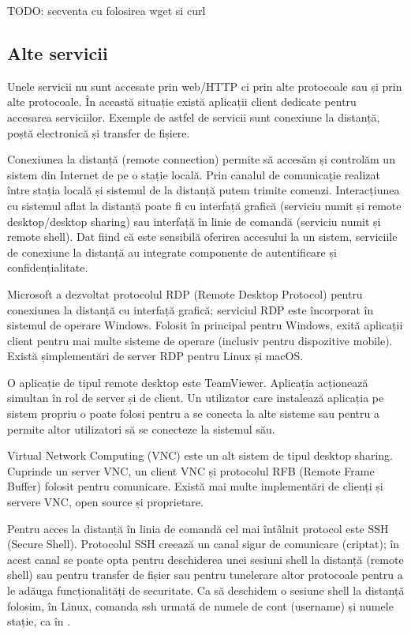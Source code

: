 \begin{screen}[caption={Clienți web în linie de comandă: wget și curl}{lst:sec:wget-curl}]
TODO: secventa cu folosirea wget si curl
\end{screen}

\subsection{Alte servicii}
\label{sec:net:services}

Unele servicii nu sunt accesate prin web/HTTP ci prin alte protocoale sau și prin alte protocoale. În această situație există aplicații client dedicate pentru accesarea serviciilor. Exemple de astfel de servicii sunt conexiune la distanță, poștă electronică și transfer de fișiere.

Conexiunea la distanță (remote connection) permite să accesăm și controlăm un sistem din Internet de pe o stație locală. Prin canalul de comunicație realizat între stația locală și sistemul de la distanță putem trimite comenzi. Interacțiunea cu sistemul aflat la distanță poate fi cu interfață grafică (serviciu numit și remote desktop/desktop sharing) sau interfață în linie de comandă (serviciu numit și remote shell). Dat fiind că este sensibilă oferirea accesului la un sistem, serviciile de conexiune la distanță au integrate componente de autentificare și confidențialitate.

Microsoft a dezvoltat protocolul RDP (Remote Desktop Protocol) pentru conexiunea la distanță cu interfață grafică; serviciul RDP este încorporat în sistemul de operare Windows. Folosit în principal pentru Windows, exită aplicații client pentru mai multe sisteme de operare (inclusiv pentru dispozitive mobile). Există șimplementări de server RDP pentru Linux și macOS.

O aplicație de tipul remote desktop este TeamViewer. Aplicația acționează simultan în rol de server și de client. Un utilizator care instalează aplicația pe sistem propriu o poate folosi pentru a se conecta la alte sisteme sau pentru a permite altor utilizatori să se conecteze la sistemul său.

Virtual Network Computing (VNC) este un alt sistem de tipul desktop sharing. Cuprinde un server VNC, un client VNC și protocolul RFB (Remote Frame Buffer) folosit pentru comunicare. Există mai multe implementări de clienți și servere VNC, open source și proprietare.

Pentru acces la distanță în linia de comandă cel mai întâlnit protocol este SSH (Secure Shell). Protocolul SSH creează un canal sigur de comunicare (criptat); în acest canal se poate opta pentru deschiderea unei sesiuni shell la distanță (remote shell) sau pentru transfer de fișier sau pentru tunelerare altor protocoale pentru a le adăuga funcționalități de securitate. Ca să deschidem o sesiune shell la distanță folosim, în Linux, comanda ssh urmată de numele de cont (username) și numele stație, ca în .

